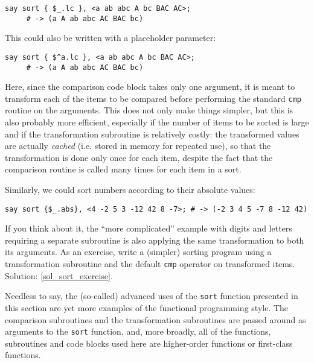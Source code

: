 \begin{verbatim}
say sort { $_.lc }, <a ab abc A bc BAC AC>;
     # -> (a A ab abc AC BAC bc)
\end{verbatim}

This could also be written with a placeholder parameter:

\begin{verbatim}
say sort { $^a.lc }, <a ab abc A bc BAC AC>;
     # -> (a A ab abc AC BAC bc)
\end{verbatim}

Here, since the comparison code block takes only one 
argument, it is meant to transform each of the items 
to be compared before performing the standard {\tt cmp} routine on 
the arguments. This does not only make things simpler, 
but this is also probably more efficient, especially if 
the number of items to be sorted is large and if the 
transformation subroutine is relatively costly: the 
transformed values are actually \emph{cached} (i.e. 
stored in memory for repeated use), so that the 
transformation is done only once for each item, despite 
the fact that the comparison routine is called many times 
for each item in a sort.

Similarly, we could sort numbers according to their 
absolute values:

\begin{verbatim}
say sort {$_.abs}, <4 -2 5 3 -12 42 8 -7>; # -> (-2 3 4 5 -7 8 -12 42)
\end{verbatim}

If you think about it, the ``more complicated'' example 
with digits and letters requiring a separate subroutine 
is also applying the same transformation to both its 
arguments. As an exercise, write a (simpler) sorting 
program using a transformation subroutine and the default 
{\tt cmp} operator on transformed items. Solution: \ref{sol_sort_exercise}.
\label{sort_exercise}

Needless to say, the (so-called) advanced uses of the 
{\tt sort} function presented in this section are yet 
more examples of the functional programming style. The 
comparison subroutines and the transformation subroutines 
are passed around as arguments to the {\tt sort} 
function, and, more broadly, all of the functions, 
subroutines and code blocks used here are higher-order 
functions or first-class functions.

